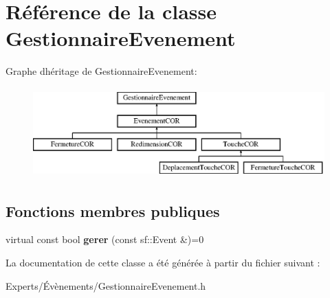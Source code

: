 \hypertarget{class_gestionnaire_evenement}{}\section{Référence de la classe Gestionnaire\+Evenement}
\label{class_gestionnaire_evenement}
Graphe d\textquotesingle{}héritage de Gestionnaire\+Evenement\+:\begin{figure}[H]
\begin{center}
\leavevmode
\includegraphics[height=3.456790cm]{class_gestionnaire_evenement}
\end{center}
\end{figure}
\subsection*{Fonctions membres publiques}
\begin{DoxyCompactItemize}
\item 
\mbox{\label{class_gestionnaire_evenement_af3dd4acdfe361172b7a30f3e9ac4b324}} 
virtual const bool {\bfseries gerer} (const sf\+::\+Event \&)=0
\end{DoxyCompactItemize}


La documentation de cette classe a été générée à partir du fichier suivant \+:\begin{DoxyCompactItemize}
\item 
Experts/Évènements/Gestionnaire\+Evenement.\+h\end{DoxyCompactItemize}
